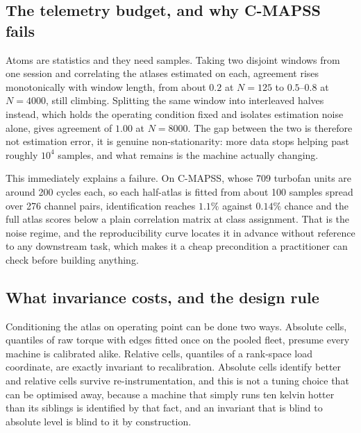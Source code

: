 \documentclass[11pt]{article}
\begin{document}

\subsection{The telemetry budget, and why C-MAPSS fails}
\label{sec:budget}

Atoms are statistics and they need samples. Taking two disjoint windows from
one session and correlating the atlases estimated on each, agreement rises
monotonically with window length, from about $0.2$ at $N=125$ to $0.5$--$0.8$
at $N=4000$, still climbing. Splitting the same window into interleaved halves
instead, which holds the operating condition fixed and isolates estimation
noise alone, gives agreement of $1.00$ at $N=8000$. The gap between the two is
therefore not estimation error, it is genuine non-stationarity: more data stops
helping past roughly $10^4$ samples, and what remains is the machine actually
changing.

This immediately explains a failure. On C-MAPSS, whose 709 turbofan units are
around 200 cycles each, so each half-atlas is fitted from about 100 samples
spread over 276 channel pairs, identification reaches $1.1\%$ against $0.14\%$
chance and the full atlas scores below a plain correlation matrix at class
assignment. That is the noise regime, and the reproducibility curve locates it
in advance without reference to any downstream task, which makes it a cheap
precondition a practitioner can check before building anything.

\subsection{What invariance costs, and the design rule}

Conditioning the atlas on operating point can be done two ways. Absolute cells,
quantiles of raw torque with edges fitted once on the pooled fleet, presume
every machine is calibrated alike. Relative cells, quantiles of a rank-space
load coordinate, are exactly invariant to recalibration. Absolute cells
identify better and relative cells survive re-instrumentation, and this is not
a tuning choice that can be optimised away, because a machine that simply runs
ten kelvin hotter than its siblings is identified by that fact, and an
invariant that is blind to absolute level is blind to it by construction.

\end{document}
